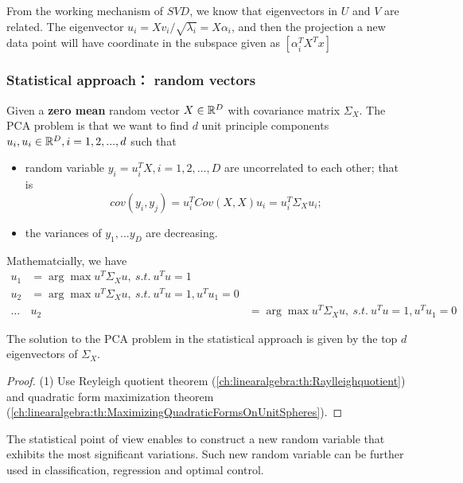 \begin{refsection}
\begin{lemma}
From the working mechanism of $SVD$, we know that eigenvectors in $U$ and $V$ are related.
The eigenvector $u_i = Xv_i/\sqrt{\lambda_i} = X\alpha_i$, and then the projection a new data point will have coordinate in the subspace given as
$[\alpha_i^T X^Tx]$
\end{lemma}


\subsubsection{Statistical approach： random vectors}
\begin{definition}
Given a \textbf{zero mean}  random  vector $X\in \mathbb{R}^D$ with covariance matrix $\Sigma_X$.  The PCA problem is that we want to find $d$ unit principle components $u_i,u_i\in \mathbb{R}^D, i=1,2,...,d$ such that 
\begin{itemize}
	\item random variable $y_i = u_i^T X, i=1,2,...,D$ are uncorrelated to each other; that is
	$$cov(y_i,y_j) = u_i^TCov(X,X)u_i = u_i^T\Sigma_X u_i;$$
	\item the variances of $y_1,...y_D$ are decreasing. 
\end{itemize}

Mathematcially, we have
\begin{align*}
    u_1 &= \arg \max u^T\Sigma_X u, ~s.t.~  u^Tu = 1  \\
    u_2 &= \arg \max u^T\Sigma_X u, ~s.t.~ u^Tu=1, u^Tu_1 = 0\\
    \dots & 
    u_2 &= \arg \max u^T\Sigma_X u, ~s.t.~ u^Tu=1, u^Tu_1 = 0
\end{align*}
\end{definition}

\begin{theorem}
The solution to the PCA problem in the statistical approach is given by the top $d$ eigenvectors of $\Sigma_X$.
\end{theorem}
\begin{proof}
(1) Use Reyleigh quotient theorem (\autoref{ch:linearalgebra:th:Raylleighquotient}) and quadratic form maximization theorem (\autoref{ch:linearalgebra:th:MaximizingQuadraticFormsOnUnitSpheres}). 
\end{proof}


\begin{remark}[implications]
The statistical point of view enables to construct a new random variable that exhibits the most significant variations. Such new random variable can be further used in classification, regression and optimal control.
\end{remark}


\end{refsection}
